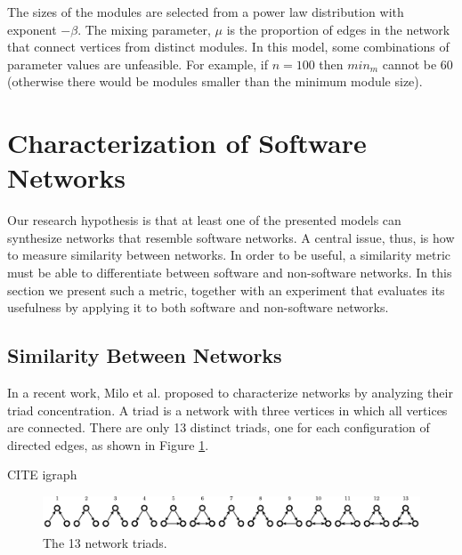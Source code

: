 The sizes of the modules are selected from a power law distribution with
exponent $-\beta$. The mixing parameter, $\mu$ is the proportion of edges in the
network that connect vertices from distinct modules. In this model, some
combinations of parameter values are unfeasible. For example, if $n = 100$ then
$min_m$ cannot be 60 (otherwise there would be modules smaller than the minimum
module size).


\section{Characterization of Software Networks}

Our research hypothesis is that at least one of the presented models can
synthesize networks that resemble software networks. A central issue, thus, is
how to measure similarity between networks. In order to be useful, a similarity
metric must be able to differentiate between software and non-software networks.
In this section we present such a metric, together with an experiment that
evaluates its usefulness by applying it to both software and non-software
networks. %

\subsection{Similarity Between Networks}

In a recent work, Milo et al. \cite{Milo2002} proposed to characterize networks
by analyzing their triad concentration. A triad is a network with three vertices
in which all vertices are connected. There are only 13 distinct triads, one for
each configuration of directed edges, as shown in Figure \ref{fig:triads}.

CITE igraph

\begin{figure}[!t]
\centering
\includegraphics[width=1.0\textwidth]{triads}
\caption{The 13 network triads.}
\label{fig:triads}
\end{figure}

